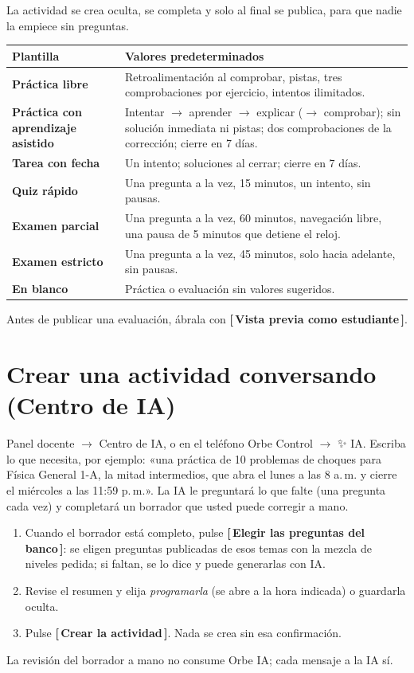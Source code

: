 \documentclass[11pt,a4paper,oneside]{book}
\newcommand{\boton}[1]{\textsf{\textbf{[\,#1\,]}}}
\newcommand{\ruta}[1]{\textsf{#1}}
\begin{document}
La actividad se crea oculta, se completa y solo al final se publica, para que nadie la empiece sin preguntas.

\begin{center}
\begin{tabularx}{\linewidth}{>{\bfseries}l X}
\toprule
Plantilla & Valores predeterminados \\
\midrule
Práctica libre & Retroalimentación al comprobar, pistas, tres comprobaciones por ejercicio, intentos ilimitados. \\
Práctica con aprendizaje asistido & Intentar $\rightarrow$ aprender $\rightarrow$ explicar ($\rightarrow$ comprobar);
                                     sin solución inmediata ni pistas; dos comprobaciones de la corrección; cierre en 7 días. \\
Tarea con fecha & Un intento; soluciones al cerrar; cierre en 7 días. \\
Quiz rápido & Una pregunta a la vez, 15 minutos, un intento, sin pausas. \\
Examen parcial & Una pregunta a la vez, 60 minutos, navegación libre, una pausa de 5 minutos que detiene el reloj. \\
Examen estricto & Una pregunta a la vez, 45 minutos, solo hacia adelante, sin pausas. \\
En blanco & Práctica o evaluación sin valores sugeridos. \\
\bottomrule
\end{tabularx}
\end{center}

\begin{consejo}
Antes de publicar una evaluación, ábrala con \boton{Vista previa como estudiante}.
\end{consejo}

\section{Crear una actividad conversando (Centro de IA)}
\ruta{Panel docente $\rightarrow$ Centro de IA}, o en el teléfono \ruta{Orbe Control $\rightarrow$ ✨ IA}. Escriba lo que
necesita, por ejemplo: «una práctica de 10 problemas de choques para Física General 1-A, la mitad intermedios, que abra
el lunes a las 8 a.\,m. y cierre el miércoles a las 11:59 p.\,m.». La IA le preguntará lo que falte (una pregunta cada
vez) y completará un borrador que usted puede corregir a mano.
\begin{enumerate}
  \item Cuando el borrador está completo, pulse \boton{Elegir las preguntas del banco}: se eligen preguntas publicadas de
        esos temas con la mezcla de niveles pedida; si faltan, se lo dice y puede generarlas con IA.
  \item Revise el resumen y elija \emph{programarla} (se abre a la hora indicada) o guardarla oculta.
  \item Pulse \boton{Crear la actividad}. Nada se crea sin esa confirmación.
\end{enumerate}
La revisión del borrador a mano no consume Orbe IA; cada mensaje a la IA sí.
\end{document}
